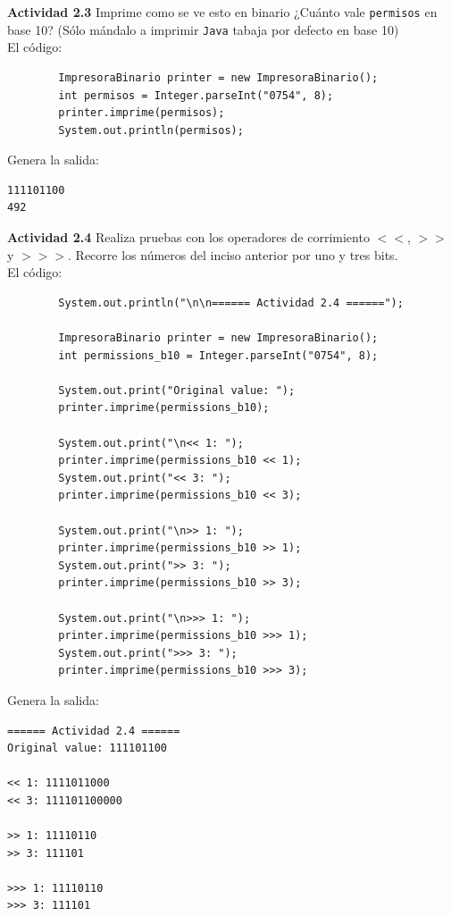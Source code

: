 \documentclass[11pt,letterpaper]{article}
\begin{document}
\textbf{Actividad 2.3} Imprime como se ve esto en binario ¿Cuánto vale \texttt{permisos}
en base 10? (Sólo mándalo a imprimir \texttt{Java} tabaja por defecto en base 10) \\

    El código:

    \begin{verbatim}
        ImpresoraBinario printer = new ImpresoraBinario();
        int permisos = Integer.parseInt("0754", 8);
        printer.imprime(permisos);
        System.out.println(permisos);
    \end{verbatim}

    Genera la salida:
    \begin{verbatim}
111101100
492
    \end{verbatim}

\textbf{Actividad 2.4} Realiza pruebas con los operadores de corrimiento $<<$, $>>$ y $>>>$.
Recorre los números del inciso anterior por uno y tres bits. \\

    El código:

    \begin{verbatim}
        System.out.println("\n\n====== Actividad 2.4 ======");

        ImpresoraBinario printer = new ImpresoraBinario();
        int permissions_b10 = Integer.parseInt("0754", 8);

        System.out.print("Original value: ");
        printer.imprime(permissions_b10);

        System.out.print("\n<< 1: ");
        printer.imprime(permissions_b10 << 1);
        System.out.print("<< 3: ");
        printer.imprime(permissions_b10 << 3);

        System.out.print("\n>> 1: ");
        printer.imprime(permissions_b10 >> 1);
        System.out.print(">> 3: ");
        printer.imprime(permissions_b10 >> 3);

        System.out.print("\n>>> 1: ");
        printer.imprime(permissions_b10 >>> 1);
        System.out.print(">>> 3: ");
        printer.imprime(permissions_b10 >>> 3);
    \end{verbatim}

    Genera la salida:
    \begin{verbatim}
====== Actividad 2.4 ======
Original value: 111101100

<< 1: 1111011000
<< 3: 111101100000

>> 1: 11110110
>> 3: 111101

>>> 1: 11110110
>>> 3: 111101
    \end{verbatim}
\end{document}
